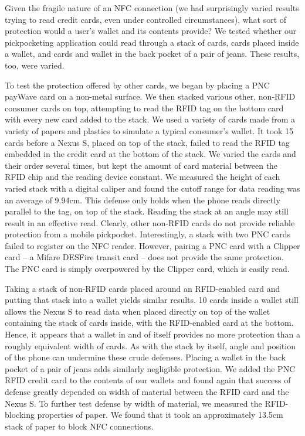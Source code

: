 \documentclass{sig-alternate}
\begin{document}
Given the fragile nature of an NFC connection (we had surprisingly varied results trying to read credit cards, even under controlled circumstances), what sort of protection would a user's wallet and its contents provide?  We tested whether our pickpocketing application could read through a stack of cards, cards placed inside a wallet, and cards and wallet in the back pocket of a pair of jeans.  These results, too, were varied.

To test the protection offered by other cards, we began by placing a PNC payWave card on a non-metal surface.  We then stacked various other, non-RFID consumer cards on top, attempting to read the RFID tag on the bottom card with every new card added to the stack.  We used a variety of cards made from a variety of papers and plastics to simulate a typical consumer's wallet.  It took 15 cards before a Nexus S, placed on top of the stack, failed to read the RFID tag embedded in the credit card at the bottom of the stack.  We varied the cards and their order several times, but kept the amount of card material between the RFID chip and the reading device constant.  We measured the height of each varied stack with a digital caliper and found the cutoff range for data reading was an average of 9.94cm.  This defense only holds when the phone reads directly parallel to the tag, on top of the stack.  Reading the stack at an angle may still result in an effective read.  Clearly, other non-RFID cards do not provide reliable protection from a mobile pickpocket.  Interestingly, a stack with two PNC cards failed to register on the NFC reader.  However, pairing a PNC card with a Clipper card -- a Mifare DESFire transit card -- does not provide the same protection.  The PNC card is simply overpowered by the Clipper card, which is easily read.

Taking a stack of non-RFID cards placed around an RFID-enabled card and putting that stack into a wallet yields similar results.  10 cards inside a wallet still allows the Nexus S to read data when placed directly on top of the wallet containing the stack of cards inside, with the RFID-enabled card at the bottom.  Hence, it appears that a wallet in and of itself provides no more protection than a roughly equivalent width of cards.  As with the stack by itself, angle and position of the phone can undermine these crude defenses. Placing a wallet in the back pocket of a pair of jeans adds similarly negligible protection. We added the PNC RFID credit card to the contents of our wallets and found again that success of defense greatly depended on width of material between the RFID card and the Nexus S.  To further test defense by width of material, we measured the RFID-blocking properties of paper.  We found that it took an approximately 13.5cm stack of paper to block NFC connections.
\end{document}
